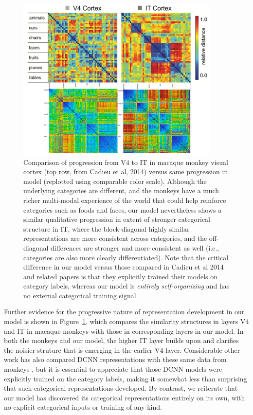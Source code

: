 \documentclass[11pt,twoside]{article}
\newif\myifpdf
\begin{document}
\begin{figure}
  \centering\includegraphics[width=4in]{fig_rsa_leabra_macaque}
  \caption{\small Comparison of progression from V4 to IT in macaque monkey visual cortex (top row, from Cadieu et al, 2014) versus same progression in model (replotted using comparable color scale).  Although the underlying categories are different, and the monkeys have a much richer multi-modal experience of the world that could help reinforce categories such as foods and faces, our model nevertheless shows a similar qualitative progression in extent of stronger categorical structure in IT, where the block-diagonal highly similar representations are more consistent across categories, and the off-diagonal differences are stronger and more consistent as well (i.e., categories are also more clearly differentiated).  Note that the critical difference in our model versus those compared in Cadieu et al 2014 and related papers is that they explicitly trained their models on category labels, whereas our model is {\em entirely self-organizing} and has no external categorical training signal.}
  \label{fig.macaque}
\end{figure}

Further evidence for the progressive nature of representation development in our model is shown in Figure~\ref{fig.macaque}, which compares the similarity structures in layers V4 and IT in macaque monkeys \cite{CadieuHongYaminsEtAl14} with those in corresponding layers in our model.  In both the monkeys and our model, the higher IT layer builds upon and clarifies the noisier struture that is emerging in the earlier V4 layer.  Considerable other work has also compared DCNN representations with these same data from monkeys \cite{CadieuHongYaminsEtAl14}, but it is essential to appreciate that those DCNN models were explicitly trained on the category labels, making it somewhat less than surprising that such categorical representations developed.  By contrast, we reiterate that our model has discovered its categorical representations entirely on its own, with no explicit categorical inputs or training of any kind.
\end{document}
